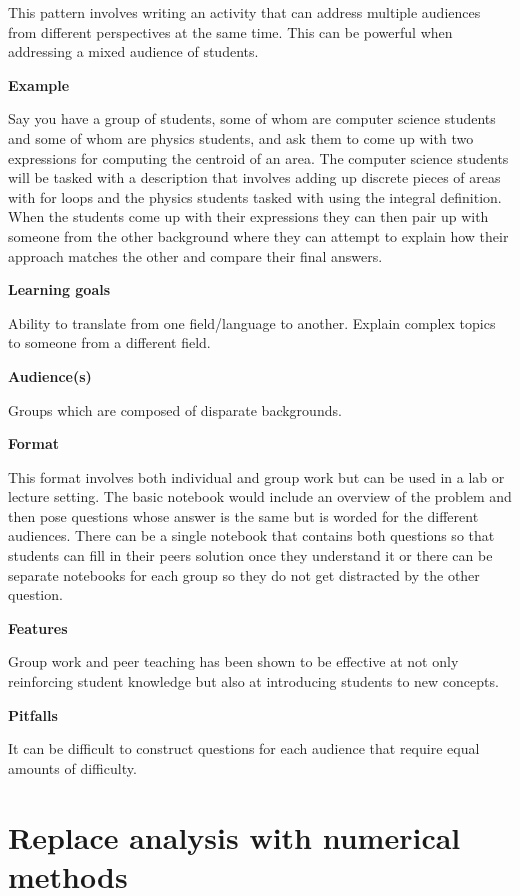 \documentclass[]{book}
\begin{document}
This pattern involves writing an activity that can address multiple
audiences from different perspectives at the same time. This can be
powerful when addressing a mixed audience of students.

\textbf{Example}

Say you have a group of students, some of whom are computer science
students and some of whom are physics students, and ask them to come up
with two expressions for computing the centroid of an area. The computer
science students will be tasked with a description that involves adding
up discrete pieces of areas with for loops and the physics students
tasked with using the integral definition. When the students come up
with their expressions they can then pair up with someone from the other
background where they can attempt to explain how their approach matches
the other and compare their final answers.

\textbf{Learning goals}

Ability to translate from one field/language to another. Explain complex
topics to someone from a different field.

\textbf{Audience(s)}

Groups which are composed of disparate backgrounds.

\textbf{Format}

This format involves both individual and group work but can be used in a
lab or lecture setting. The basic notebook would include an overview of
the problem and then pose questions whose answer is the same but is
worded for the different audiences. There can be a single notebook that
contains both questions so that students can fill in their peers
solution once they understand it or there can be separate notebooks for
each group so they do not get distracted by the other question.

\textbf{Features}

Group work and peer teaching has been shown to be effective at not only
reinforcing student knowledge but also at introducing students to new
concepts.

\textbf{Pitfalls}

It can be difficult to construct questions for each audience that
require equal amounts of difficulty.\\

\section{Replace analysis with numerical
methods}\label{replace-analysis-with-numerical-methods}
\end{document}
